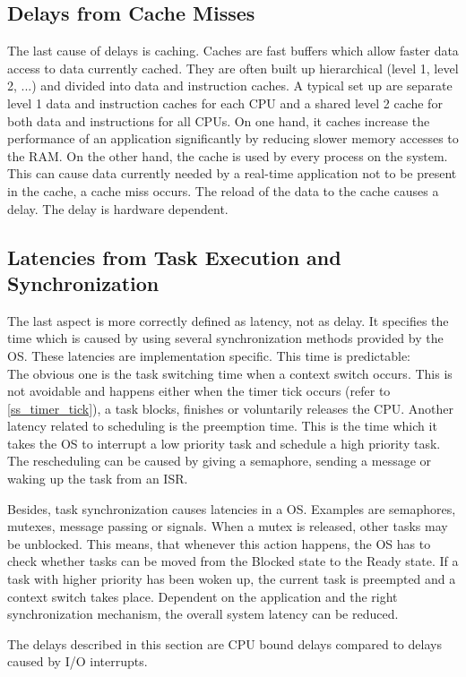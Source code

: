 \subsection{Delays from Cache Misses}
The last cause of delays is caching.
Caches are fast buffers which allow faster data access to data currently cached.
They are often built up hierarchical (level 1, level 2, ...) and divided into data and instruction caches.
A typical set up are separate level 1 data and instruction caches for each \ac{CPU} and a shared level 2 cache for both data and instructions for all \acp{CPU}.
On one hand, it caches increase the performance of an application significantly by reducing slower memory accesses to the \ac{RAM}. 
On the other hand, the cache is used by every process on the system.
This can cause data currently needed by a real-time application not to be present in the cache, a cache miss occurs.
The reload of the data to the cache causes a delay.
The delay is hardware dependent. 

\subsection{Latencies from Task Execution and Synchronization}
The last aspect is more correctly defined as latency, not as delay.
It specifies the time which is caused by using several synchronization methods provided by the \ac{OS}. 
These latencies are implementation specific.
This time is predictable:
\\The obvious one is the task switching time when a context switch occurs.
This is not avoidable and happens either when the timer tick occurs (refer to \ref{ss_timer_tick}), a task blocks, finishes or voluntarily releases the \ac{CPU}.
Another latency related to scheduling is the preemption time.
This is the time which it takes the \ac{OS} to interrupt a low priority task and schedule a high priority task.
The rescheduling can be caused by giving a semaphore, sending a message or waking up the task from an \ac{ISR}.
\par
Besides, task synchronization causes latencies in a \ac{OS}.
Examples are semaphores, mutexes, message passing or signals. 
When a mutex is released, other tasks may be unblocked.
This means, that whenever this action happens, the \ac{OS} has to check whether tasks can be moved from the Blocked state to the Ready state.
If a task with higher priority has been woken up, the current task is preempted and a context switch takes place.
Dependent on the application and the right synchronization mechanism, the overall system latency can be reduced.
\par
The delays described in this section are \ac{CPU} bound delays compared to delays caused by \ac{I/O} interrupts.
 
